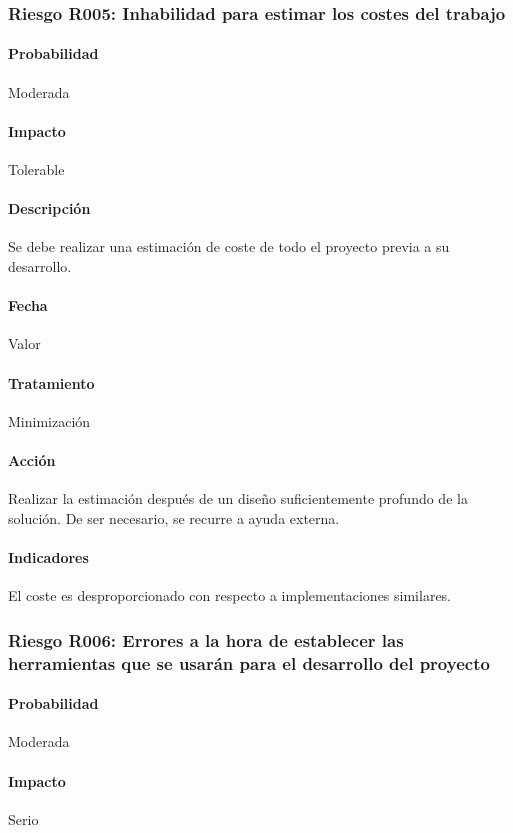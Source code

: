 \documentclass[10pt,a4paper]{article}
\begin{document}
			\subsubsection{Riesgo R005: Inhabilidad para estimar los costes del trabajo}
				\paragraph{Probabilidad} Moderada
				\paragraph{Impacto}	Tolerable
				\paragraph{Descripción} Se debe realizar una estimación de coste de todo el proyecto previa a su desarrollo.
				\paragraph{Fecha} Valor %
				\paragraph{Tratamiento} Minimización %
				\paragraph{Acción} Realizar la estimación después de un diseño suficientemente profundo de la solución. De ser necesario, se recurre a ayuda externa. %
				\paragraph{Indicadores} El coste es desproporcionado con respecto a implementaciones similares. %
				
			\subsubsection{Riesgo R006: Errores a la hora de establecer las herramientas que se usarán para el desarrollo del proyecto}
				\paragraph{Probabilidad} Moderada
				\paragraph{Impacto}	Serio
\end{document}
